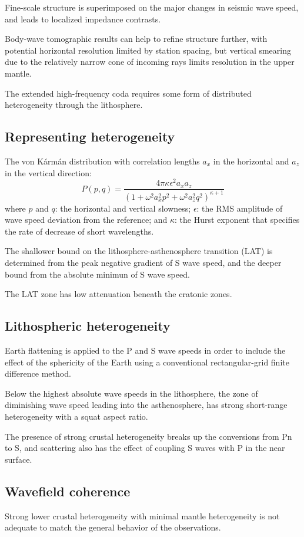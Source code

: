 Fine-scale structure is superimposed on the major changes in seismic wave speed,
and leads to localized impedance contrasts.

Body-wave tomographic results can help to refine structure further,
with potential horizontal resolution limited by station spacing,
but vertical smearing due to the relatively narrow cone of
incoming rays limits resolution in the upper mantle.

The extended high-frequency coda requires some form of
distributed heterogeneity through the lithosphere.

\subsection{Representing heterogeneity}
The von K\'arm\'an distribution with correlation lengths
$a_x$ in the horizontal and $a_z$ in the vertical direction:
\[ P(p, q) = \frac{4\pi\kappa\epsilon^2 a_x a_z}
  {(1 + \omega^2 a_x^2 p^2 + \omega^2 a_z^2 q^2)^{\kappa + 1}} \]
where $p$ and $q$: the horizontal and vertical slowness;
$\epsilon$: the RMS amplitude of wave speed deviation from the reference;
and $\kappa$: the Hurst exponent that specifies the rate of decrease
of short wavelengths.

The shallower bound on the lithosphere-asthenosphere transition (LAT)
is determined from the peak negative gradient of S wave speed,
and the deeper bound from the absolute minimun of S wave speed.

The LAT zone has low attenuation beneath the cratonic zones.

\subsection{Lithospheric heterogeneity}
Earth flattening is applied to the P and S wave speeds in order to include
the effect of the sphericity of the Earth using
a conventional rectangular-grid finite difference method.

Below the highest absolute wave speeds in the lithosphere,
the zone of diminishing wave speed leading into the asthenosphere,
has strong short-range heterogeneity with a squat aspect ratio.

The presence of strong crustal heterogeneity breaks up the conversions
from Pn to S, and scattering also has the effect of
coupling S waves with P in the near surface.

\subsection{Wavefield coherence}
Strong lower crustal heterogeneity with minimal mantle heterogeneity is not
adequate to match the general behavior of the observations.


